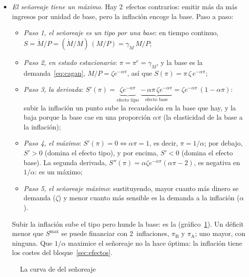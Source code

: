 \documentclass[11pt]{article}
\begin{document}
\begin{itemize}
\item \emph{El señoreaje tiene un máximo}. Hay 2~efectos contrarios: emitir más da más ingresos por unidad de base, pero la inflación encoge la base. Paso a paso:
  \begin{itemize}
  \item \emph{Paso 1, el señoreaje es un tipo por una base}: en tiempo continuo, $S=\dot M/P=(\dot M/M)\,(M/P)=\gamma_M\,M/P$;
  \item \emph{Paso 2, en estado estacionario}: $\pi=\pi^e=\gamma_M$, y la base es la demanda~\eqref{eq:cagan}, $M/P=\zeta e^{-\alpha\pi}$, así que $S(\pi)=\pi\,\zeta\,e^{-\alpha\pi}$;
  \item \emph{Paso 3, la derivada}: $S'(\pi)=\underbrace{\zeta e^{-\alpha\pi}}_{\text{efecto tipo}}\;\underbrace{-\,\alpha\pi\,\zeta e^{-\alpha\pi}}_{\text{efecto base}}=\zeta e^{-\alpha\pi}\,(1-\alpha\pi)$: subir la inflación un punto sube la recaudación en la base que hay, y la baja porque la base cae en una proporción $\alpha\pi$ (la elasticidad de la base a la inflación);
  \item \emph{Paso 4, el máximo}: $S'(\pi)=0\iff\alpha\pi=1$, es decir, $\pi=1/\alpha$; por debajo, $S'>0$ (domina el efecto tipo), y por encima, $S'<0$ (domina el efecto base). La segunda derivada, $S''(\pi)=\alpha\zeta e^{-\alpha\pi}(\alpha\pi-2)$, es negativa en $1/\alpha$: es un máximo;
  \item \emph{Paso 5, el señoreaje máximo}: sustituyendo,
    mayor cuanto más dinero se demanda ($\zeta$) y menor cuanto más sensible es la demanda a la inflación ($\alpha$).
  \end{itemize}
  Subir la inflación sube el tipo pero hunde la base: es la  (gráfico~\ref{fig:laffer-senoreaje}). Un déficit menor que $S^{\max}$ se puede financiar con 2~inflaciones, $\pi_{\mathrm B}$ y $\pi_{\mathrm A}$; uno mayor, con ninguna. Que $1/\alpha$ maximice el señoreaje no la hace óptima: la inflación tiene los costes del bloque~\ref{sec:efectos}.
\end{itemize}

\begin{figure}[H]
\centering
\caption{La curva de  del señoreaje}\label{fig:laffer-senoreaje}
\end{figure}
\end{document}
